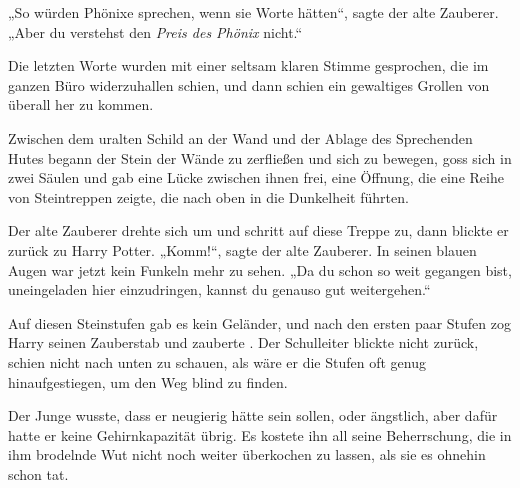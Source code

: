 „So würden Phönixe sprechen, wenn sie Worte hätten“, sagte der alte Zauberer. „Aber du verstehst den \emph{Preis des Phönix} nicht.“

Die letzten Worte wurden mit einer seltsam klaren Stimme gesprochen, die im ganzen Büro widerzuhallen schien, und dann schien ein gewaltiges Grollen von überall her zu kommen.

Zwischen dem uralten Schild an der Wand und der Ablage des Sprechenden Hutes begann der Stein der Wände zu zerfließen und sich zu bewegen, goss sich in zwei Säulen und gab eine Lücke zwischen ihnen frei, eine Öffnung, die eine Reihe von Steintreppen zeigte, die nach oben in die Dunkelheit führten.

Der alte Zauberer drehte sich um und schritt auf diese Treppe zu, dann blickte er zurück zu Harry Potter. „Komm!“, sagte der alte Zauberer. In seinen blauen Augen war jetzt kein Funkeln mehr zu sehen. „Da du schon so weit gegangen bist, uneingeladen hier einzudringen, kannst du genauso gut weitergehen.“

\later

Auf diesen Steinstufen gab es kein Geländer, und nach den ersten paar Stufen zog Harry seinen Zauberstab und zauberte . Der Schulleiter blickte nicht zurück, schien nicht nach unten zu schauen, als wäre er die Stufen oft genug hinaufgestiegen, um den Weg blind zu finden.

Der Junge wusste, dass er neugierig hätte sein sollen, oder ängstlich, aber dafür hatte er keine Gehirnkapazität übrig. Es kostete ihn all seine Beherrschung, die in ihm brodelnde Wut nicht noch weiter überkochen zu lassen, als sie es ohnehin schon tat.


